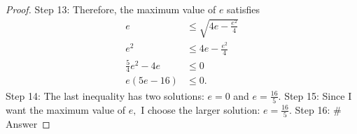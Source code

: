 \documentclass{article}
\begin{document}
\begin{proof}
Step 13: Therefore, the maximum value of $e$ satisfies\begin{align*}e &\leq \sqrt{4e - \frac{e^2}{4}} \\ e^2 &\leq 4e - \frac{e^2}{4} \\ \frac{5}{4}e^2 - 4e &\leq 0 \\ e(5e - 16) &\leq 0.\end{align*}
Step 14: The last inequality has two solutions: $e = 0$ and $e = \frac{16}{5}.$
Step 15: Since I want the maximum value of $e,$ I choose the larger solution: $e = \frac{16}{5}.$
Step 16: # Answer
\end{proof}
\end{document}
